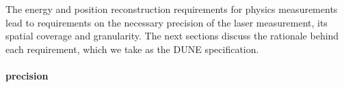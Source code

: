 




The energy and position reconstruction requirements for physics measurements lead to requirements on the necessary precision of the laser %
\efield measurement, its spatial coverage and granularity. The next sections discuss the rationale behind each requirement, which we take as the DUNE specification.

\paragraph{\efield precision}

